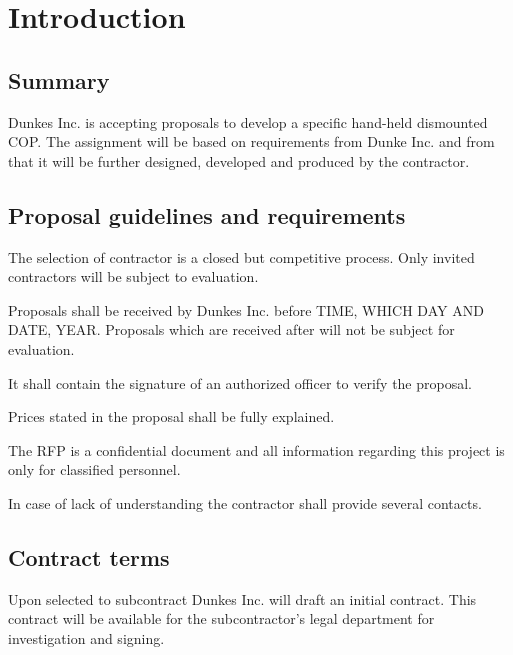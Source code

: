 \chapter{Introduction}
\section{Summary}
Dunkes Inc. is accepting proposals to develop a specific hand-held dismounted COP. The assignment will be based on requirements from Dunke Inc. and from that it will be further designed, developed and produced by the contractor.  

\section{Proposal guidelines and requirements}
The selection of contractor is a closed but competitive process. Only invited contractors will be subject to evaluation. 

Proposals shall be received by Dunkes Inc. before TIME, WHICH DAY AND DATE, YEAR. Proposals which are received after will not be subject for evaluation. 

It shall contain the signature of an authorized officer to verify the proposal. 

Prices stated in the proposal shall be fully explained. 

The RFP is a confidential document and all information regarding this project is only for classified personnel. 

In case of lack of understanding the contractor shall provide several contacts. 

\section{Contract terms}
Upon selected to subcontract Dunkes Inc. will draft an initial contract. This contract will be available for the subcontractor's legal department for investigation and signing.